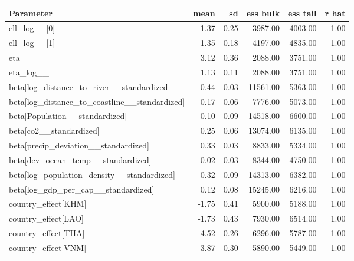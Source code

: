 \begin{table}[htbp]
\centering
{}
\label{tab:full_model_params_sea}
\footnotesize
\begin{tabular}{lrrrrr}
\toprule
\textbf{Parameter} & \textbf{mean} & \textbf{sd} & \textbf{ess bulk} & \textbf{ess tail} & \textbf{r hat} \\
\midrule
ell\_log\_\_[0] & -1.37 & 0.25 & 3987.00 & 4003.00 & 1.00 \\
ell\_log\_\_[1] & -1.35 & 0.18 & 4197.00 & 4835.00 & 1.00 \\
eta & 3.12 & 0.36 & 2088.00 & 3751.00 & 1.00 \\
eta\_log\_\_ & 1.13 & 0.11 & 2088.00 & 3751.00 & 1.00 \\
beta[log\_distance\_to\_river\_\_standardized] & -0.44 & 0.03 & 11561.00 & 5363.00 & 1.00 \\
beta[log\_distance\_to\_coastline\_\_standardized] & -0.17 & 0.06 & 7776.00 & 5073.00 & 1.00 \\
beta[Population\_\_standardized] & 0.10 & 0.09 & 14518.00 & 6600.00 & 1.00 \\
beta[co2\_\_standardized] & 0.25 & 0.06 & 13074.00 & 6135.00 & 1.00 \\
beta[precip\_deviation\_\_standardized] & 0.33 & 0.03 & 8833.00 & 5334.00 & 1.00 \\
beta[dev\_ocean\_temp\_\_standardized] & 0.02 & 0.03 & 8344.00 & 4750.00 & 1.00 \\
beta[log\_population\_density\_\_standardized] & 0.32 & 0.09 & 14313.00 & 6382.00 & 1.00 \\
beta[log\_gdp\_per\_cap\_\_standardized] & 0.12 & 0.08 & 15245.00 & 6216.00 & 1.00 \\
country\_effect[KHM] & -1.75 & 0.41 & 5900.00 & 5188.00 & 1.00 \\
country\_effect[LAO] & -1.73 & 0.43 & 7930.00 & 6514.00 & 1.00 \\
country\_effect[THA] & -4.52 & 0.26 & 6296.00 & 5787.00 & 1.00 \\
country\_effect[VNM] & -3.87 & 0.30 & 5890.00 & 5449.00 & 1.00 \\
\bottomrule
\end{tabular}
\end{table}
